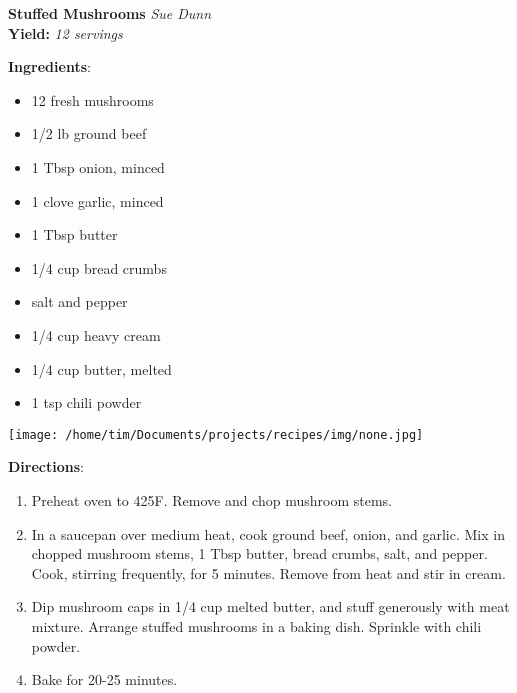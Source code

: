 \documentclass[11pt, twoside, openany]{book}
\begin{document}
\noindent\begin{minipage}[t]{\linewidth}%
{\Large\textbf{Stuffed Mushrooms}} \label{stuffed-mushrooms}\hfill\textit{Sue Dunn}\\
\textbf{Yield:} \textit{12 servings}\\
\noindent\begin{minipage}[t]{0.78\linewidth}%
\textbf{Ingredients}:\vspace{-3mm}
\begin{multicols}{2}
\begin{itemize}\setlength\itemsep{-1mm}
\item 12 fresh mushrooms
\item 1/2 lb ground beef
\item 1 Tbsp onion, minced
\item 1 clove garlic, minced
\item 1 Tbsp butter
\item 1/4 cup bread crumbs
\item salt and pepper
\item 1/4 cup heavy cream
\item 1/4 cup butter, melted
\item 1 tsp chili powder
\end{itemize}
\end{multicols}
\end{minipage}
\noindent\begin{minipage}[t]{0.18\linewidth}
\centering \strut\vspace*{-\baselineskip}\newline
\texttt{[image: /home/tim/Documents/projects/recipes/img/none.jpg]}\\
\end{minipage}\vspace{3mm}
\textbf{Directions}:
\vspace{-3mm}\begin{enumerate}\setlength\itemsep{-1mm}
\item Preheat oven to 425F. Remove and chop mushroom stems.
\item In a saucepan over medium heat, cook ground beef, onion, and garlic. Mix in chopped mushroom stems, 1 Tbsp butter, bread crumbs, salt, and pepper. Cook, stirring frequently, for 5 minutes. Remove from heat and stir in cream.
\item Dip mushroom caps in 1/4 cup melted butter, and stuff generously with meat mixture. Arrange stuffed mushrooms in a baking dish. Sprinkle with chili powder.
\item Bake for 20-25 minutes.
\end{enumerate}
\end{minipage}\vspace{8mm}
\end{document}
